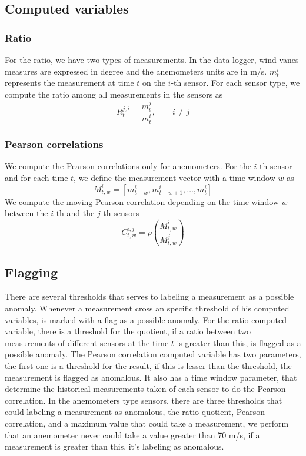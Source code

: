 \documentclass[journal]{IEEEtran}
\begin{document}
\subsection{Computed variables}\label{subsec:computedvariables}
\subsubsection{Ratio}
For the ratio, we have two types of measurements. In the data logger, wind vanes measures are expressed in degree and the anemometers units are in m/s.  $m_t^{i}$ represents the measurement at time $t$ on the $i$-th sensor.
For each sensor type, we compute the ratio among all measurements in the sensors as
\begin{equation}
R_{t}^{j,i} = \frac{m_{t}^{j}}{m_{t}^{i}},\qquad i \neq j 
\end{equation}



\subsubsection{Pearson correlations}
We compute the Pearson correlations only for anemometers. For the $i$-th sensor and for each time $t$, we define the measurement vector with a time window $w$ as 
\begin{equation}
M^i_{t,w} = [m_{t-w}^i,m_{t-w+1}^i,\ldots,m_t^i]
\end{equation}
We compute the moving Pearson correlation depending on the time window $w$ between the $i$-th and the $j$-th sensors
\begin{equation}
C^{i,j}_{t,w}= \rho\left( \frac{M^i_{t,w}}{M^j_{t,w}}\right)
\end{equation}

\subsection{Flagging}\label{subsec:flagging}
There are several thresholds that serves to labeling a measurement as a possible anomaly. Whenever a measurement cross an specific threshold of his computed variables, is marked with a flag as a possible anomaly. 
For the ratio computed variable, there is a threshold for the quotient, if a ratio between two measurements of different sensors at the time $t$ is greater than this, is flagged as a possible anomaly. 
The Pearson correlation computed variable has two parameters, the first one is a threshold for the result, if this is lesser than the threshold, the measurement is flagged as anomalous. It also has a time window parameter, that determine the historical measurements taken of each sensor to do the Pearson correlation.
In the anemometers type sensors, there are three thresholds that could labeling a measurement as anomalous, the ratio quotient, Pearson correlation, and a maximum value that could take a measurement, we perform that an anemometer never could take a value greater than 70 m/s, if a measurement is greater than this, it's labeling as anomalous.
\end{document}
